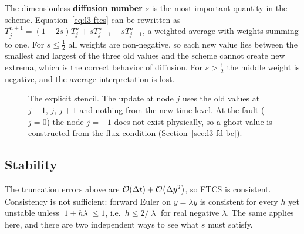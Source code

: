 The dimensionless \textbf{diffusion number} $s$ is the most important quantity in the scheme. Equation~\eqref{eq:l3-ftcs} can be rewritten as $T_j^{n+1}=(1-2s)T_j^n+sT_{j+1}^n+sT_{j-1}^n$, a weighted average with weights summing to one. For $s\le\tfrac12$ all weights are non-negative, so each new value lies between the smallest and largest of the three old values and the scheme cannot create new extrema, which is the correct behavior of diffusion. For $s>\tfrac12$ the middle weight is negative, and the average interpretation is lost.

\begin{figure}[ht]
\centering
{}
\caption{The explicit stencil. The update at node $j$ uses the old values at $j-1$, $j$, $j+1$ and nothing from the new time level. At the fault ($j=0$) the node $j=-1$ does not exist physically, so a ghost value is constructed from the flux condition (Section~\ref{sec:l3-fd-bc}).}
\label{fig:l3-stencil}
\end{figure}

\subsection{Stability}
\label{sec:l3-fd-stab}

The truncation errors above are $\mathcal{O}\!\left(\Delta t\right)+\mathcal{O}\!\left(\Delta y^2\right)$, so FTCS is consistent. Consistency is not sufficient: forward Euler on $\dot y=\lambda y$ is consistent for every $h$ yet unstable unless $|1+h\lambda|\le1$, i.e.\ $h\le2/|\lambda|$ for real negative $\lambda$. The same applies here, and there are two independent ways to see what $s$ must satisfy.

